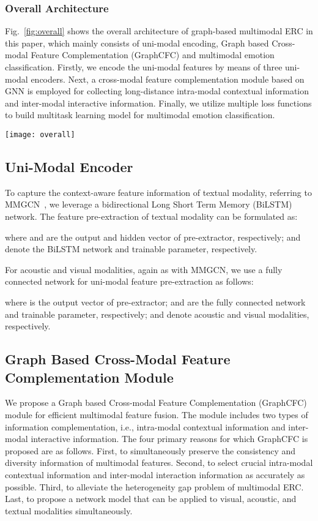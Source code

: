 \documentclass[lettersize,journal]{IEEEtran}
\begin{document}
\subsubsection{Overall Architecture}
Fig.~\ref{fig:overall} shows the overall architecture of graph-based multimodal ERC in this paper, which mainly consists of uni-modal encoding, Graph based Cross-modal Feature Complementation (GraphCFC) and multimodal emotion classification. Firstly, we encode the uni-modal features by means of three uni-modal encoders. Next, a cross-modal feature complementation module based on GNN is employed for collecting long-distance intra-modal contextual information and inter-modal interactive information. Finally, we utilize multiple loss functions to build multitask learning model for multimodal emotion classification.
\begin{figure*}[htbp]
\centering
\texttt{[image: overall]}\caption{The illustration of graph-based multimodal ERC, which includes uni-modal encoding, graph based cross-modal feature complementation and multimodal emotion classification.}
\label{fig:overall}
\end{figure*}

\subsection{Uni-Modal Encoder}
To capture the context-aware feature information of textual modality, referring to MMGCN~\cite{hu2021mmgcn}, we leverage a bidirectional Long Short Term Memory (BiLSTM) network. The feature pre-extraction of textual modality can be formulated as:

where  and  are the output and hidden vector of pre-extractor, respectively;  and  denote the BiLSTM network and trainable parameter, respectively.

For acoustic and visual modalities, again as with MMGCN, we use a fully connected network for uni-modal feature pre-extraction as follows:

where  is the output vector of pre-extractor;  and  are the fully connected network and trainable parameter, respectively;  and  denote acoustic and visual modalities, respectively.

\subsection{Graph Based Cross-Modal Feature Complementation Module}
We propose a Graph based Cross-modal Feature Complementation (GraphCFC) module for efficient multimodal feature fusion. The module includes two types of information complementation, i.e., intra-modal contextual information and inter-modal interactive information. The four primary reasons for which GraphCFC is proposed are as follows. First, to simultaneously preserve the consistency and diversity information of multimodal features. Second, to select crucial intra-modal contextual information and inter-modal interaction information as accurately as possible. Third, to alleviate the heterogeneity gap problem of multimodal ERC. Last, to propose a network model that can be applied to visual, acoustic, and textual modalities simultaneously.
\end{document}
